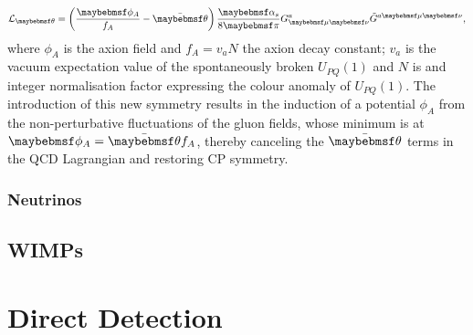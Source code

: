 %
\begin{equation}
    \mathcal{L}_{\theta} = \left( \frac{\phi_A}{f_{A}} - \Bar{\theta} \right) \frac{\alpha_{s}}{8\pi} G^{a}_{\mu\nu}\Tilde{G}^{a\mu\nu},
\end{equation}
%
where $\phi_{A}$ is the axion field and $f_{A}=v_{a}N$ the axion decay constant; $v_{a}$ is the vacuum expectation value of the spontaneously broken $U_{PQ}(1)$ and $N$ is and integer normalisation factor expressing the colour anomaly of $U_{PQ}(1)$. The introduction of this new symmetry results in the induction of a potential $\phi_{A}$ from the non-perturbative fluctuations of the gluon fields, whose minimum is at $\phi_{A} = \Bar{\theta}f_{A}$, thereby canceling the $\Bar{\theta}$ terms in the QCD Lagrangian and restoring CP symmetry. 





\subsubsection{Neutrinos}
\label{subsubsec:neutrinos}



\subsection{WIMPs}
\label{subsec:wimp_dm}




\section{Direct Detection}
\label{sec:candidates}